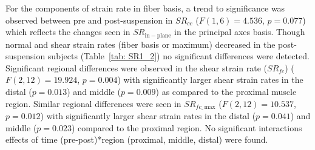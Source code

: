For the components of strain rate in fiber basis, a trend to significance was observed between pre and post-suspension in $SR_{cc}$ ($F(1,6) = 4.536$, $p=0.077$) which reflects the changes seen in $SR_{\mathrm{in-plane}}$ in the principal axes basis. 
Though normal and shear strain rates (fiber basis or maximum) decreased in the post-suspension subjects (Table~\ref{tab: SR1_2}) no significant differences were detected.
Significant regional differences were observed in the shear strain rate ($SR_{fc}$) ($F(2,12) = 19.924$, $p = 0.004$) with significantly larger shear strain rates in the distal ($p = 0.013$) and middle ($p = 0.009$) as compared to the proximal muscle region. 
Similar regional differences were seen in $SR_{fc\_\,\mathrm{max}}$ ($F(2,12) = 10.537$, $p = 0.012$) with significantly larger shear strain rates in the distal ($p = 0.041$) and middle ($p = 0.023$) compared to the proximal region. 
No significant interactions effects of time (pre-post)*region (proximal, middle, distal) were found.

